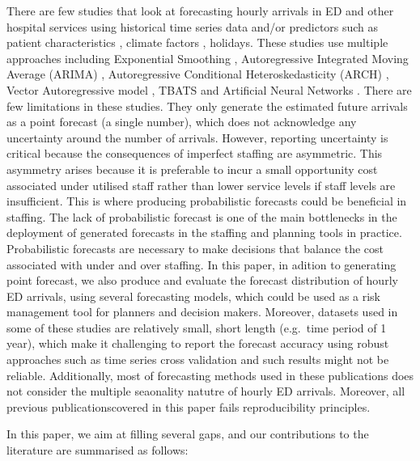 \documentclass[]{elsarticle} %
\begin{document}
There are few studies that look at forecasting hourly arrivals in ED and other hospital services using historical time series data and/or predictors such as patient characteristics , climate factors , holidays. These studies use multiple approaches including Exponential Smoothing \citep{SvetunkovAdam}, Autoregressive Integrated Moving Average (ARIMA) \citep{hyndman2021forecasting}, Autoregressive Conditional Heteroskedasticity (ARCH) \citep{bollerslev1994arch}, Vector Autoregressive model \citep{lutkepohl2013vector}, TBATS \citep{de2011forecasting} and Artificial Neural Networks \citep{hyndman2021forecasting}. There are few limitations in these studies. They only generate the estimated future arrivals as a point forecast (a single number), which does not acknowledge any uncertainty around the number of arrivals. However, reporting uncertainty is critical because the consequences of imperfect staffing are asymmetric. This asymmetry arises because it is preferable to incur a small opportunity cost associated under utilised staff rather than lower service levels if staff levels are insufficient. This is where producing probabilistic forecasts could be beneficial in staffing. The lack of probabilistic forecast is one of the main bottlenecks in the deployment of generated forecasts in the staffing and planning tools in practice. Probabilistic forecasts are necessary to make decisions that balance the cost associated with under and over staffing. In this paper, in adition to generating point forecast, we also produce and evaluate the forecast distribution of hourly ED arrivals, using several forecasting models, which could be used as a risk management tool for planners and decision makers. Moreover, datasets used in some of these studies are relatively small, short length (e.g.~time period of 1 year), which make it challenging to report the forecast accuracy using robust approaches such as time series cross validation and such results might not be reliable. Additionally, most of forecasting methods used in these publications does not consider the multiple seaonality natutre of hourly ED arrivals. Moreover, all previous publicationscovered in this paper fails reproducibility principles.

In this paper, we aim at filling several gaps, and our contributions to the literature are summarised as follows:
\end{document}
